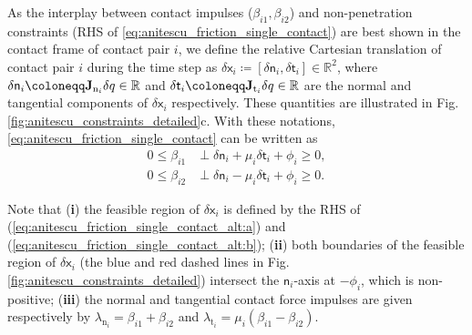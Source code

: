 As the interplay between contact impulses ($\beta_{i1}, \beta_{i2}$) and non-penetration constraints (RHS of \eqref{eq:anitescu_friction_single_contact}) are best shown in the contact frame of contact pair $i$, we define the relative Cartesian translation of contact pair $i$ during the time step as $\delta \mathsf{x}_i \coloneqq [\delta \mathsf{n}_i, \delta \mathsf{t}_i] \in \mathbb{R}^2$, where $\delta \mathsf{n}_i \coloneqq \Jn[i] \dq \in \mathbb{R}$ and $\delta \mathsf{t}_i \coloneqq \Jt[i] \dq \in \mathbb{R}$ are the normal and tangential components of $\delta \mathsf{x}_i$ respectively. These quantities are illustrated in Fig. \ref{fig:anitescu_constraints_detailed}c. With these notations, \eqref{eq:anitescu_friction_single_contact} can be written as
\begin{subequations}
\label{eq:anitescu_friction_single_contact_alt}
\begin{align}
0 \leq \beta_{i1} &\perp \delta \mathsf{n}_i + \mu_i \delta \mathsf{t}_i + \phi_i  \geq 0, \label{eq:anitescu_friction_single_contact_alt:a}\\
0 \leq \beta_{i2} &\perp  \delta \mathsf{n}_i - \mu_i \delta \mathsf{t}_i + \phi_i \geq 0. \label{eq:anitescu_friction_single_contact_alt:b}
\end{align}
\end{subequations}


Note that (\textbf{i}) the feasible region of $\delta \mathsf{x}_i$ is defined by the RHS of (\ref{eq:anitescu_friction_single_contact_alt:a}) and (\ref{eq:anitescu_friction_single_contact_alt:b}); (\textbf{ii}) both boundaries of the feasible region of $\delta \mathsf{x}_i$ (the blue and red dashed lines in Fig. \ref{fig:anitescu_constraints_detailed}) intersect the $\mathsf{n}_i$-axis at $-\phi_i$, which is non-positive; (\textbf{iii}) the normal and tangential contact force impulses are given respectively by $\lambda_{\mathrm{n}_i} = \beta_{i1} + \beta_{i2}$ and $\lambda_{\mathrm{t}_{i}} = \mu_i \left( \beta_{i1} - \beta_{i2}\right)$.

